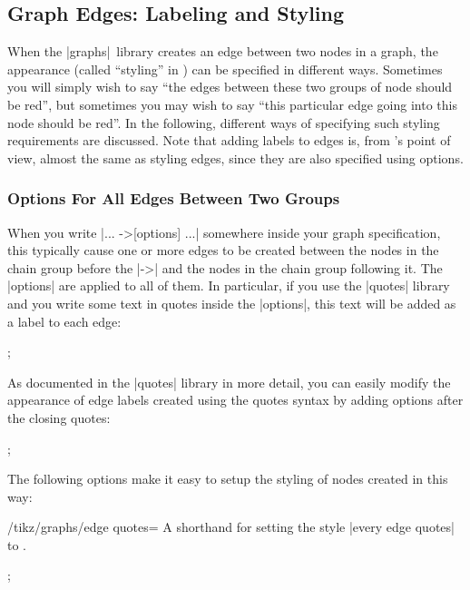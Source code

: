 \subsection{Graph Edges: Labeling and Styling}

When the |graphs| library creates an edge between two nodes in a graph, the
appearance (called ``styling'' in \tikzname) can be specified in different
ways. Sometimes you will simply wish to say ``the edges between these two
groups of node should be red'', but sometimes you may wish to say ``this
particular edge going into this node should be red''. In the following,
different ways of specifying such styling requirements are discussed. Note that
adding labels to edges is, from \tikzname's point of view, almost the same as
styling edges, since they are also specified using options.


\subsubsection{Options For All Edges Between Two Groups}

When you write |... ->[options] ...| somewhere inside your graph specification,
this typically cause one or more edges to be created between the nodes in the
chain group before the |->| and the nodes in the chain group following it. The
|options| are applied to all of them. In particular, if you use the |quotes|
library and you write some text in quotes inside the |options|, this text will
be added as a label to each edge:
%
\begin{codeexample}[preamble={\usetikzlibrary{graphs,quotes}}]
\tikz
  ;
\end{codeexample}

As documented in the |quotes| library in more detail, you can easily modify the
appearance of edge labels created using the quotes syntax by adding options
after the closing quotes:
%
\begin{codeexample}[preamble={\usetikzlibrary{graphs,quotes}}]
\tikz {};
\end{codeexample}

The following options make it easy to setup the styling of nodes created in
this way:
%
\begin{key}{/tikz/graphs/edge quotes=}
    A shorthand for setting the style |every edge quotes| to .
\begin{codeexample}[preamble={\usetikzlibrary{graphs,quotes}}]
  \tikz {};
\end{codeexample}
\end{key}

